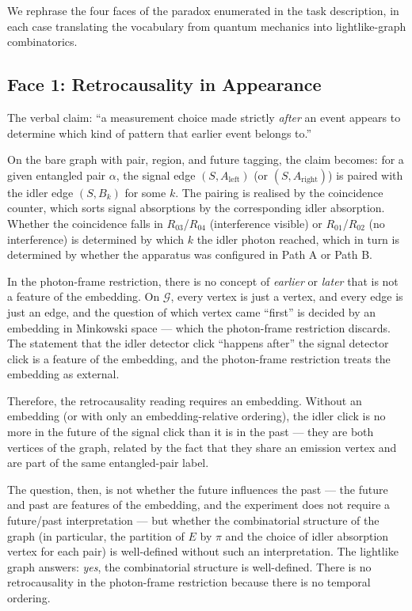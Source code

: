 \documentclass[11pt]{article}
\begin{document}
We rephrase the four faces of the paradox enumerated in the task description, in each case translating the vocabulary from quantum mechanics into lightlike-graph combinatorics.

\subsection{Face 1: Retrocausality in Appearance}

The verbal claim: ``a measurement choice made strictly \emph{after} an event appears to determine which kind of pattern that earlier event belongs to.''

On the bare graph with pair, region, and future tagging, the claim becomes: for a given entangled pair $\alpha$, the signal edge $(S, A_{\text{left}})$ (or $(S, A_{\text{right}})$) is paired with the idler edge $(S, B_k)$ for some $k$. The pairing is realised by the coincidence counter, which sorts signal absorptions by the corresponding idler absorption. Whether the coincidence falls in $R_{03}$/$R_{04}$ (interference visible) or $R_{01}$/$R_{02}$ (no interference) is determined by which $k$ the idler photon reached, which in turn is determined by whether the apparatus was configured in Path A or Path B.

In the photon-frame restriction, there is no concept of \emph{earlier} or \emph{later} that is not a feature of the embedding. On $\mathcal{G}$, every vertex is just a vertex, and every edge is just an edge, and the question of which vertex came ``first'' is decided by an embedding in Minkowski space --- which the photon-frame restriction discards. The statement that the idler detector click ``happens after'' the signal detector click is a feature of the embedding, and the photon-frame restriction treats the embedding as external.

Therefore, the retrocausality reading requires an embedding. Without an embedding (or with only an embedding-relative ordering), the idler click is no more in the future of the signal click than it is in the past --- they are both vertices of the graph, related by the fact that they share an emission vertex and are part of the same entangled-pair label.

The question, then, is not whether the future influences the past --- the future and past are features of the embedding, and the experiment does not require a future/past interpretation --- but whether the combinatorial structure of the graph (in particular, the partition of $E$ by $\pi$ and the choice of idler absorption vertex for each pair) is well-defined without such an interpretation. The lightlike graph answers: \emph{yes}, the combinatorial structure is well-defined. There is no retrocausality in the photon-frame restriction because there is no temporal ordering.
\end{document}
